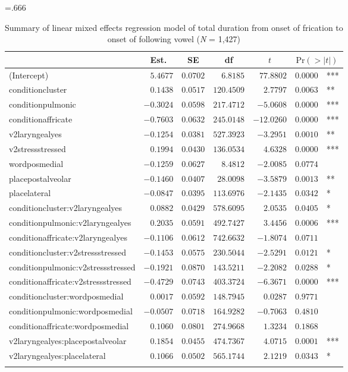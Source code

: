 \documentclass[output=paper,colorlinks,citecolor=brown]{langscibook}
\begin{document}
    \begin{table}
    \caption{Summary of linear mixed effects regression model of total duration from onset of frication to onset of following vowel (\textit{N} = 1,427)}
    \label{Table:total-dur-model}
    \footnotesize\tabcolsep=.666\tabcolsep
    \begin{tabular}{lrrrrr@{\,}l}
			\lsptoprule
			\multicolumn{1}{l}{coef} & 
			\multicolumn{1}{c}{Est.} &
			\multicolumn{1}{c}{SE} & 
			\multicolumn{1}{c}{df} & 
			\multicolumn{1}{c}{$t$} & 
			\multicolumn{2}{c}{$\text{Pr}(>|t|)$}\\
			\midrule
    (Intercept)&$ 5.4677$&$0.0702$&$  6.8185$&$ 77.8802$&$0.0000$&***\\
    conditioncluster&$ 0.1438$&$0.0517$&$120.4509$&$  2.7797$&$0.0063$&**\\
    conditionpulmonic&$-0.3024$&$0.0598$&$217.4712$&$ -5.0608$&$0.0000$&***\\
	conditionaffricate&$-0.7603$&$0.0632$&$245.0148$&$-12.0260$&$0.0000$&***\\
	v2laryngealyes&$-0.1254$&$0.0381$&$527.3923$&$ -3.2951$&$0.0010$&**\\
	v2stressstressed&$ 0.1994$&$0.0430$&$136.0534$&$  4.6328$&$0.0000$&***\\
	wordposmedial&$-0.1259$&$0.0627$&$  8.4812$&$ -2.0085$&$0.0774$&\\
	placepostalveolar&$-0.1460$&$0.0407$&$ 28.0098$&$ -3.5879$&$0.0013$&**\\
	placelateral&$-0.0847$&$0.0395$&$113.6976$&$ -2.1435$&$0.0342$&*\\
	conditioncluster:v2laryngealyes&$ 0.0882$&$0.0429$&$578.6095$&$  2.0535$&$0.0405$&*\\
	conditionpulmonic:v2laryngealyes&$ 0.2035$&$0.0591$&$492.7427$&$  3.4456$&$0.0006$&***\\
	conditionaffricate:v2laryngealyes&$-0.1106$&$0.0612$&$742.6632$&$ -1.8074$&$0.0711$&\\
	conditioncluster:v2stressstressed&$-0.1453$&$0.0575$&$230.5044$&$ -2.5291$&$0.0121$&*\\
	conditionpulmonic:v2stressstressed&$-0.1921$&$0.0870$&$143.5211$&$ -2.2082$&$0.0288$&*\\
	conditionaffricate:v2stressstressed&$-0.4729$&$0.0743$&$403.3724$&$ -6.3671$&$0.0000$&***\\
	conditioncluster:wordposmedial&$ 0.0017$&$0.0592$&$148.7945$&$0.0287$&$0.9771$&\\
	conditionpulmonic:wordposmedial&$-0.0507$&$0.0718$&$164.9282$&$ -0.7063$&$0.4810$&\\
	conditionaffricate:wordposmedial&$ 0.1060$&$0.0801$&$274.9668$&$  1.3234$&$0.1868$&\\
	v2laryngealyes:placepostalveolar&$ 0.1854$&$0.0455$&$474.7367$&$  4.0715$&$0.0001$&***\\
	v2laryngealyes:placelateral&$ 0.1066$&$0.0502$&$565.1744$&$  2.1219$&$0.0343$&*\\
	\lspbottomrule
\end{tabular}
\end{table}

\printbibliography[heading=subbibliography,notkeyword=this]
\end{document}
